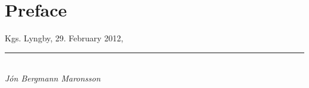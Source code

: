 \section*{Preface}

\placeholder

\vspace{10mm}
\begin{flushright}
Kgs. Lyngby, 29. February 2012,\\

\vspace{15mm}

\rule{50mm}{0.1pt}\\
\textit{J\'on Bergmann Maronsson}
\end{flushright}
